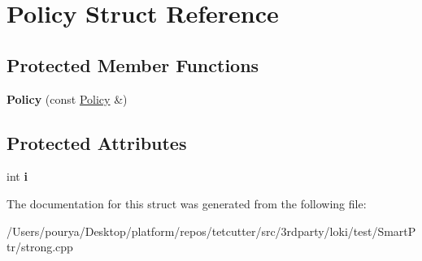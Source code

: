 \hypertarget{structPolicy}{}\section{Policy Struct Reference}
\label{structPolicy}
\subsection*{Protected Member Functions}
\begin{DoxyCompactItemize}
\item 
\hypertarget{structPolicy_a5c3a2393dce0c3d1080c315805daeb53}{}{\bfseries Policy} (const \hyperlink{structPolicy}{Policy} \&)\label{structPolicy_a5c3a2393dce0c3d1080c315805daeb53}

\end{DoxyCompactItemize}
\subsection*{Protected Attributes}
\begin{DoxyCompactItemize}
\item 
\hypertarget{structPolicy_a179da42f576bb021a1e1d490ca0c0b16}{}int {\bfseries i}\label{structPolicy_a179da42f576bb021a1e1d490ca0c0b16}

\end{DoxyCompactItemize}


The documentation for this struct was generated from the following file\+:\begin{DoxyCompactItemize}
\item 
/\+Users/pourya/\+Desktop/platform/repos/tetcutter/src/3rdparty/loki/test/\+Smart\+Ptr/strong.\+cpp\end{DoxyCompactItemize}

